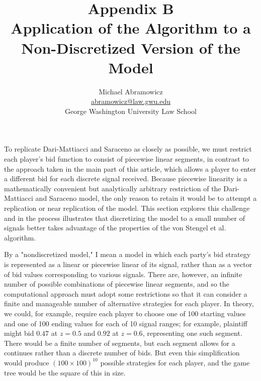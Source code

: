 \documentclass{article}
\begin{document}
\title{Appendix B \\ Application of the Algorithm to a Non-Discretized Version of the Model}
\author{Michael Abramowicz \\ \href{mailto:abramowicz@law.gwu.edu}{abramowicz@law.gwu.edu} \\ George Washington University Law School}

\maketitle

To replicate Dari-Mattiacci and Saraceno as closely as possible, we must restrict each player's bid function to consist of piecewise linear segments, in contrast to the approach taken in the main part of this article, which allows a player to enter a different bid for each discrete signal received. Because piecewise linearity is a mathematically convenient but analytically arbitrary restriction of the Dari-Mattiacci and Saraceno model, the only reason to retain it would be to attempt a replication or near replication of the model. This section explores this challenge and in the process illustrates that discretizing the model to a small number of signals better takes advantage of the properties of the von Stengel et al. algorithm.

By a "nondiscretized model," I mean a model in which each party's bid strategy is represented as a linear or piecewise linear of its signal, rather than as a vector of bid values corresponding to various signals. There are, however, an infinite number of possible combinations of piecewise linear segments, and so the computational approach must adopt some restrictions so that it can consider a finite and manageable number of alternative strategies for each player. In theory, we could, for example, require each player to choose one of 100 starting values and one of 100 ending values for each of 10 signal ranges; for example, plaintiff might bid $0.47$ at $z=0.5$ and $0.92$ at $z=0.6$, representing one such segment. There would be a finite number of segments, but each segment allows for a continues rather than a discrete number of bids. But even this simplification would produce $(100 \times 100)^{10}$ possible strategies for each player, and the game tree would be the square of this in size. 
\end{document}
